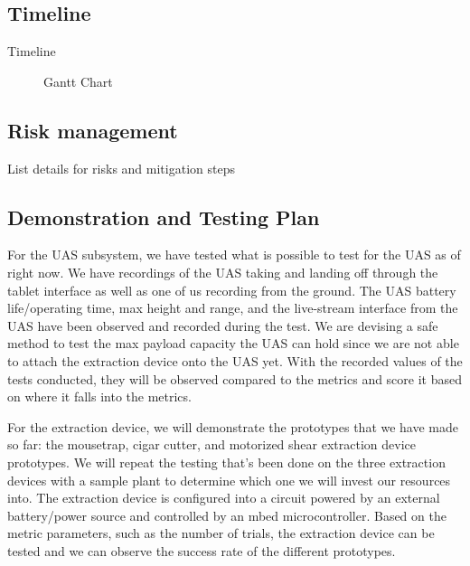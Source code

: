 \documentclass{wrcecapstone}
\begin{document}
\subsection{Timeline}
\begin{table}
\caption{Timeline}
\end{table}
\begin{figure}
\caption{Gantt Chart}
\end{figure}





\subsection{Risk management}
\begin{table}
\caption{List details for risks and mitigation steps}
\end{table}







\subsection{Demonstration and Testing Plan}
For the UAS subsystem, we have tested what is possible to test for the UAS as of right now. We have recordings of the UAS taking and landing off through the tablet interface as well as one of us recording from the ground. The UAS battery life/operating time, max height and range, and the live-stream interface from the UAS have been observed and recorded during the test. We are devising a safe method to test the max payload capacity the UAS can hold since we are not able to attach the extraction device onto the UAS yet. With the recorded values of the tests conducted, they will be observed compared to the metrics and score it based on where it falls into the metrics.

For the extraction device, we will demonstrate the prototypes that we have made so far: the mousetrap, cigar cutter, and motorized shear extraction device prototypes. We will repeat the testing that’s been done on the three extraction devices with a sample plant to determine which one we will invest our resources into. The extraction device is configured into a circuit powered by an external battery/power source and controlled by an mbed microcontroller. Based on the metric parameters, such as the number of trials, the extraction device can be tested and we can observe the success rate of the different prototypes.
\end{document}
